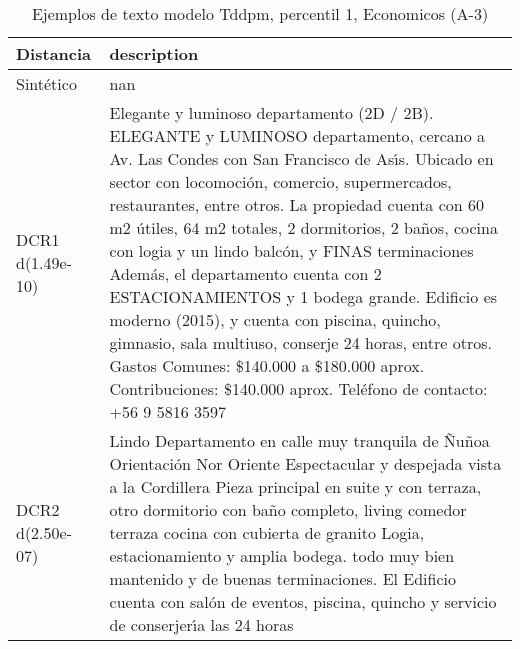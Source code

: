\begin{table}[H]
\centering
\fontsize{10}{14}\selectfont
\caption{Ejemplos de texto modelo Tddpm, percentil 1, Economicos (A-3)}
\label{table-example-economicos-a-3-tddpm_mlp-1p-text}
\begin{tabular}{|l|m{35em}|}
\hline
\rowcolor[gray]{0.8}
Distancia & description \\
\hline Sintético & nan \\
\hline DCR1 d(1.49e-10) & Elegante y luminoso departamento (2D / 2B).  ELEGANTE y LUMINOSO departamento, cercano a Av. Las Condes con San Francisco de As{\'\i}s. Ubicado en sector con locomoci\'on, comercio, supermercados, restaurantes, entre otros.  La propiedad cuenta con 60 m2 \'utiles, 64 m2 totales, 2 dormitorios, 2 ba\~nos, cocina con logia y un lindo balc\'on, y FINAS terminaciones  Adem\'as, el departamento cuenta con 2 ESTACIONAMIENTOS y 1 bodega grande.  Edificio es moderno (2015), y cuenta con piscina, quincho, gimnasio, sala multiuso, conserje 24 horas, entre otros.  Gastos Comunes: \$140.000 a \$180.000 aprox. Contribuciones: \$140.000 aprox.  Tel\'efono de contacto: +56 9 5816 3597 \\
\hline DCR2 d(2.50e-07) & Lindo Departamento en calle muy tranquila de \~Nu\~noa Orientaci\'on Nor Oriente Espectacular y despejada vista a la Cordillera Pieza principal en suite y con terraza, otro dormitorio con ba\~no completo, living comedor terraza cocina con cubierta de granito Logia, estacionamiento y amplia bodega. todo muy bien mantenido y de buenas terminaciones. El Edificio cuenta con sal\'on de eventos, piscina, quincho y  servicio de conserjer{\'\i}a las 24 horas \\
\hline
\end{tabular}
\end{table}
